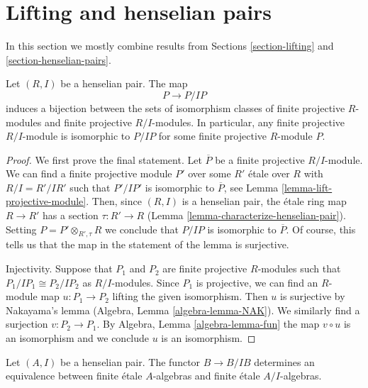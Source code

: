 








\section{Lifting and henselian pairs}
\label{section-lifting-henselian-pairs}

\noindent
In this section we mostly combine results from
Sections \ref{section-lifting} and \ref{section-henselian-pairs}.

\begin{lemma}
\label{lemma-lift-finite-projective-module}
Let $(R, I)$ be a henselian pair. The map
$$
P \longrightarrow P/IP
$$
induces a bijection between the sets of isomorphism classes of finite
projective $R$-modules and finite projective $R/I$-modules. In particular,
any finite projective $R/I$-module is isomorphic to $P/IP$
for some finite projective $R$-module $P$.
\end{lemma}

\begin{proof}
We first prove the final statement. Let $\overline{P}$ be a finite
projective $R/I$-module. We can find a finite projective module $P'$
over some $R'$ \'etale over $R$ with $R/I = R'/IR'$ such that
$P'/IP'$ is isomorphic to $\overline{P}$, see
Lemma \ref{lemma-lift-projective-module}.
Then, since $(R, I)$ is a henselian pair, the \'etale ring map $R \to R'$ has
a section $\tau : R' \to R$ (Lemma \ref{lemma-characterize-henselian-pair}).
Setting $P = P' \otimes_{R', \tau} R$ we conclude that $P/IP$
is isomorphic to $\overline{P}$. Of course, this tells us that
the map in the statement of the lemma is surjective.

\medskip\noindent
Injectivity. Suppose that $P_1$ and $P_2$ are finite projective $R$-modules such
that $P_1/IP_1 \cong P_2/IP_2$ as $R/I$-modules. Since $P_1$ is projective,
we can find an $R$-module map $u : P_1 \to P_2$ lifting the given isomorphism.
Then $u$ is surjective by Nakayama's lemma
(Algebra, Lemma \ref{algebra-lemma-NAK}).
We similarly find a surjection $v : P_2 \to P_1$.
By Algebra, Lemma \ref{algebra-lemma-fun} the map $v \circ u$
is an isomorphism and we conclude $u$ is an isomorphism.
\end{proof}

\begin{lemma}
\label{lemma-finite-etale-equivalence}
Let $(A, I)$ be a henselian pair. The functor $B \to B/IB$ determines
an equivalence between finite \'etale $A$-algebras and finite \'etale
$A/I$-algebras.
\end{lemma}

